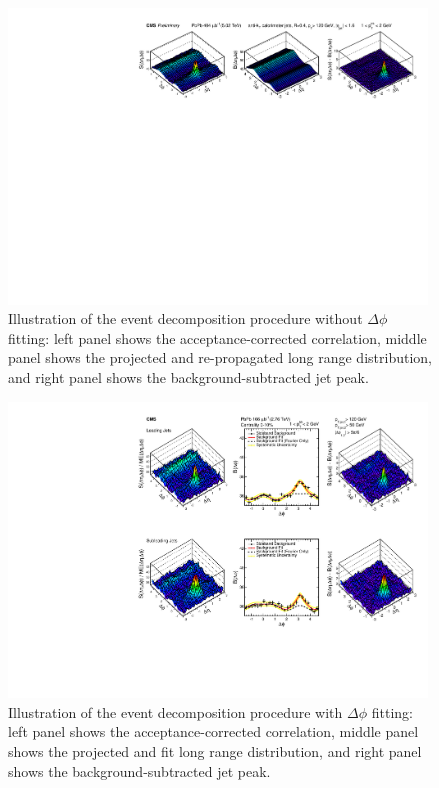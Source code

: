 \begin{figure}[t!] 
\begin{center} 
\includegraphics[width=0.99\textwidth]{figures/Results/Background_Subtraction.pdf}
\caption[Illustration of the event decomposition procedure without $\Delta\phi$ fitting]{Illustration of the event decomposition procedure without $\Delta\phi$ fitting:  left panel shows the acceptance-corrected correlation, middle panel shows the projected and re-propagated long range distribution, and right panel shows the background-subtracted jet peak.}
\label{fig:BG_sub1}
\end{center} 
\end{figure}

\begin{figure}[hbt] 
\begin{center} 
\includegraphics[width=0.99\textwidth]{figures/Results/PAS_Figure_2_TrkPt1_TrkPt2.pdf}
\caption[Illustration of the event decomposition procedure with $\Delta\phi$ fitting]{Illustration of the event decomposition procedure with $\Delta\phi$ fitting:  left panel shows the acceptance-corrected correlation, middle panel shows the projected and fit long range distribution, and right panel shows the background-subtracted jet peak.}
\label{fig:BG_sub2}
\end{center} 
\end{figure}


